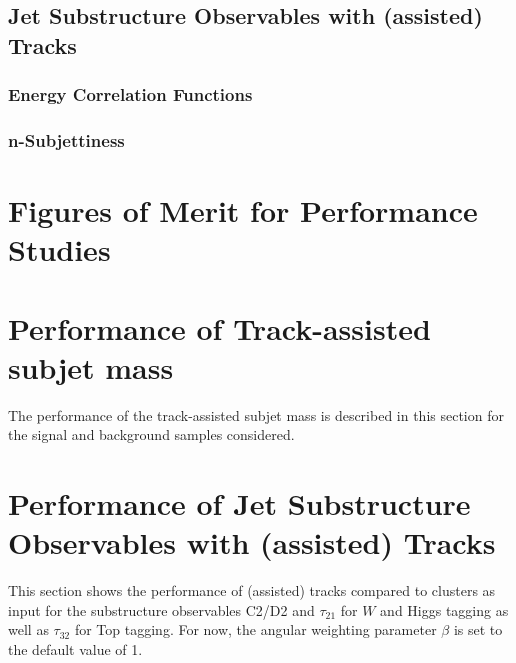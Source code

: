 \documentclass[UKenglish,texlive=2013]{\ATLASLATEXPATH atlasdoc}
\begin{document}


\subsection{Jet Substructure Observables with (assisted) Tracks}\label{sec:tas_jss}



\subsubsection{Energy Correlation Functions}\label{subsec:ECF}


\subsubsection{n-Subjettiness}\label{subsec:nSub}


\clearpage
\section{Figures of Merit for Performance Studies}\label{sec:FoM}


\clearpage
\section{Performance of Track-assisted subjet mass}
\label{sec:mtas}
The performance of the track-assisted subjet mass is described in this section for the signal and background samples considered.

\clearpage
\section{Performance of Jet Substructure Observables with (assisted) Tracks}\label{sec:def_beta}
This section shows the performance of (assisted) tracks compared to clusters as input for the substructure observables C2/D2 and $\tau_{21}$ for $W$ and Higgs tagging as well as $\tau_{32}$ for Top tagging. For now, the angular weighting parameter $\beta$ is set to the default value of 1.
\end{document}
